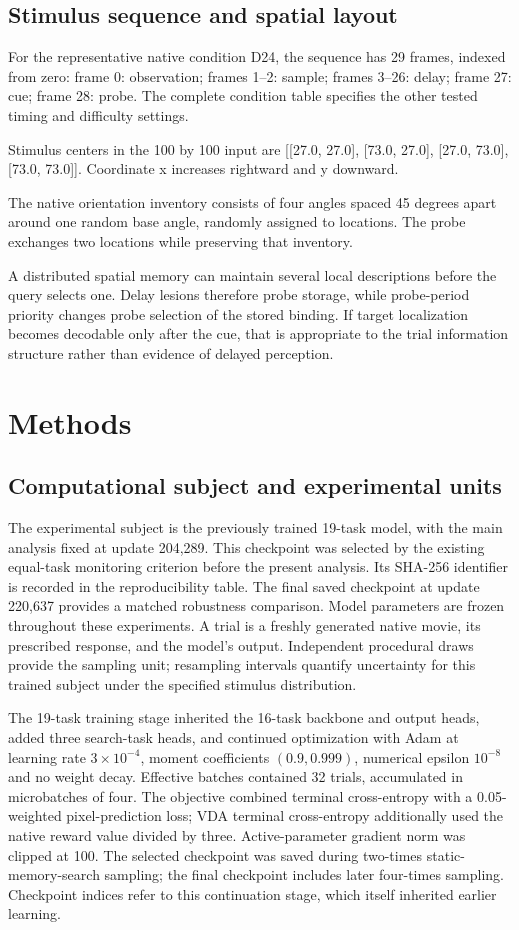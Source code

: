\documentclass[11pt]{article}
\begin{document}
\subsection{Stimulus sequence and spatial layout}
For the representative native condition D24, the sequence has 29 frames, indexed from zero: frame 0: observation; frames 1--2: sample; frames 3--26: delay; frame 27: cue; frame 28: probe. The complete condition table specifies the other tested timing and difficulty settings.

Stimulus centers in the 100 by 100 input are [[27.0, 27.0], [73.0, 27.0], [27.0, 73.0], [73.0, 73.0]]. Coordinate x increases rightward and y downward.

The native orientation inventory consists of four angles spaced 45 degrees apart around one random base angle, randomly assigned to locations. The probe exchanges two locations while preserving that inventory.

A distributed spatial memory can maintain several local descriptions before the query selects one. Delay lesions therefore probe storage, while probe-period priority changes probe selection of the stored binding. If target localization becomes decodable only after the cue, that is appropriate to the trial information structure rather than evidence of delayed perception.


\section{Methods}
\subsection{Computational subject and experimental units}
The experimental subject is the previously trained 19-task model, with the main analysis fixed at update 204,289. This checkpoint was selected by the existing equal-task monitoring criterion before the present analysis. Its SHA-256 identifier is recorded in the reproducibility table. The final saved checkpoint at update 220,637 provides a matched robustness comparison. Model parameters are frozen throughout these experiments. A trial is a freshly generated native movie, its prescribed response, and the model's output. Independent procedural draws provide the sampling unit; resampling intervals quantify uncertainty for this trained subject under the specified stimulus distribution.

The 19-task training stage inherited the 16-task backbone and output heads, added three search-task heads, and continued optimization with Adam at learning rate $3\times10^{-4}$, moment coefficients $(0.9,0.999)$, numerical epsilon $10^{-8}$ and no weight decay. Effective batches contained 32 trials, accumulated in microbatches of four. The objective combined terminal cross-entropy with a 0.05-weighted pixel-prediction loss; VDA terminal cross-entropy additionally used the native reward value divided by three. Active-parameter gradient norm was clipped at 100. The selected checkpoint was saved during two-times static-memory-search sampling; the final checkpoint includes later four-times sampling. Checkpoint indices refer to this continuation stage, which itself inherited earlier learning.
\end{document}
